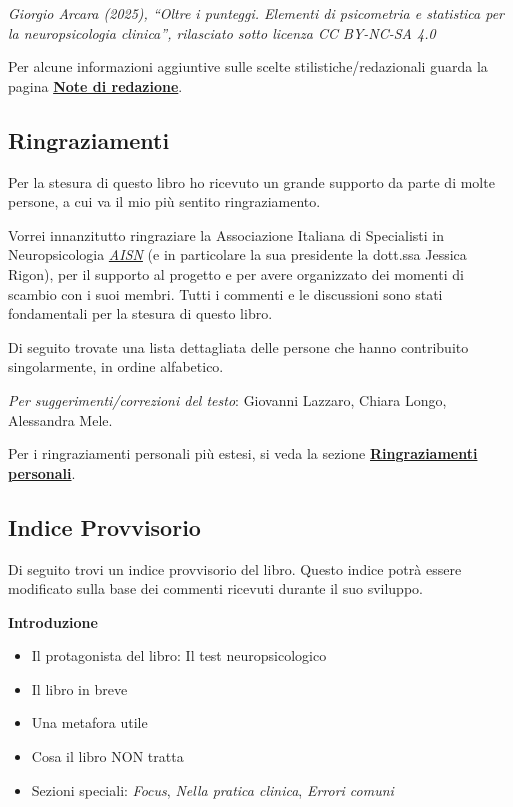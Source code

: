 \documentclass[
  italian,
  letterpaper,
  paper=A4,
  headinclude=on,
  footinclude=on,
  12pt]{scrbook}
\providecommand{\tightlist}{%
  \setlength{\itemsep}{0pt}\setlength{\parskip}{0pt}}
\begin{document}
\emph{Giorgio Arcara (2025), ``Oltre i punteggi. Elementi di psicometria
e statistica per la neuropsicologia clinica'', rilasciato sotto licenza
CC BY-NC-SA 4.0}

Per alcune informazioni aggiuntive sulle scelte stilistiche/redazionali
guarda la pagina \hyperref[note_redazione]{\textbf{Note di redazione}}.

\subsection*{Ringraziamenti}\label{ringraziamenti}

Per la stesura di questo libro ho ricevuto un grande supporto da parte
di molte persone, a cui va il mio più sentito ringraziamento.

Vorrei innanzitutto ringraziare la Associazione Italiana di Specialisti
in Neuropsicologia \href{https://aisn.pro/}{\emph{AISN}} (e in
particolare la sua presidente la dott.ssa Jessica Rigon), per il
supporto al progetto e per avere organizzato dei momenti di scambio con
i suoi membri. Tutti i commenti e le discussioni sono stati fondamentali
per la stesura di questo libro.

Di seguito trovate una lista dettagliata delle persone che hanno
contribuito singolarmente, in ordine alfabetico.

\emph{Per suggerimenti/correzioni del testo}: Giovanni Lazzaro, Chiara
Longo, Alessandra Mele.

Per i ringraziamenti personali più estesi, si veda la sezione
\hyperref[ringraziamenti_personali]{\textbf{Ringraziamenti personali}}.

\vspace{2em}

\subsection*{Indice Provvisorio}\label{indice-provvisorio}

Di seguito trovi un indice provvisorio del libro. Questo indice potrà
essere modificato sulla base dei commenti ricevuti durante il suo
sviluppo.

\textbf{Introduzione}

\begin{itemize}
\tightlist
\item
  Il protagonista del libro: Il test neuropsicologico
\item
  Il libro in breve
\item
  Una metafora utile
\item
  Cosa il libro NON tratta
\item
  Sezioni speciali: \emph{Focus}, \emph{Nella pratica clinica},
  \emph{Errori comuni}
\end{itemize}
\end{document}

